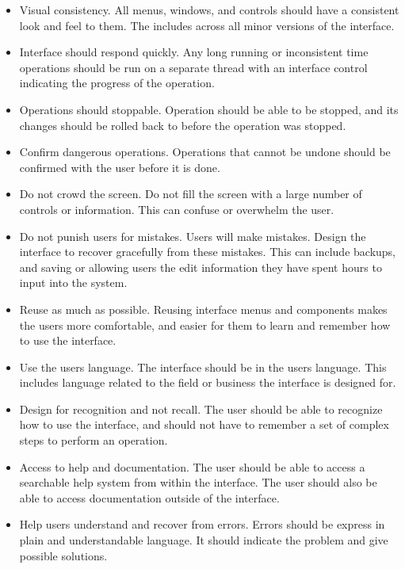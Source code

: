 \documentclass[12pt]{article}
\begin{document}
\begin{itemize}

\item Visual consistency.  All menus, windows, and controls should have a
consistent look and feel to them.  The includes across all minor versions
of the interface.

\item Interface should respond quickly.  Any long running or inconsistent 
time operations should be run on a separate thread with an interface control
indicating the progress of the operation.

\item Operations should stoppable.  Operation should be able to be
stopped, and its changes should be rolled back to before the operation
was stopped.

\item Confirm dangerous operations.  Operations that cannot be undone 
should be confirmed with the user before it is done.

\item Do not crowd the screen.  Do not fill the screen with a large number
of controls or information.  This can confuse or overwhelm the user.

\item Do not punish users for mistakes.  Users will make mistakes.  Design
the interface to recover gracefully from these mistakes.  This can include
backups, and saving or allowing users the edit information they have
spent hours to input into the system.

\item Reuse as much as possible.  Reusing interface menus and components
makes the users more comfortable, and easier for them to learn and remember
how to use the interface.

\item Use the users language.  The interface should be in the users
language.  This includes language related to the field or business the
interface is designed for.

\item Design for recognition and not recall.  The user should be able to
recognize how to use the interface, and should not have to remember a set 
of complex steps to perform an operation.

\item Access to help and documentation.  The user should be able to access 
a searchable help system from within the interface.  The user should also
be able to access documentation outside of the interface.  

\item Help users understand and recover from errors.  Errors should be
express in plain and understandable language.  It should indicate the 
problem and give possible solutions.

\end{itemize}
\end{document}
